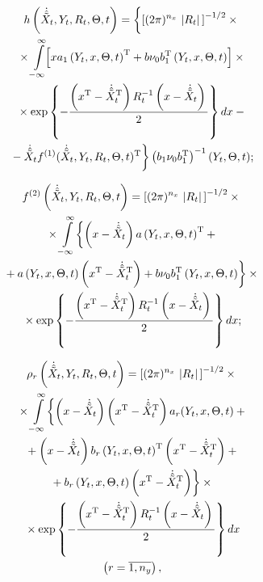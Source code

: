 \begin{multicols}{2}
    \noindent
\begin{multline*}
h\left(\dot{\hat{\tilde  X}}_t, Y_t,R_t,\Theta,t\right)=\biggl\{ \lk (2\pi)^{n_x}\lv
    R_t\rv\rk^{-1/2}\times{}\\
    {}\times\int\limits_{-\infty}^\infty\!\!
    \lk xa_1\left(Y_t,x,\Theta,t\right)^{\mathrm{T}} + b\nu_0 b_1^{\mathrm{T}} \left(Y_t,x,\Theta,t\right)\rk\times{}\\
{}\times \exp \lf -\fr{\left(x^{\mathrm{T}} -\dot{\hat{\tilde  X}}_t^{\mathrm{T}}\right) R_t^{-1} \left(x -
\dot{\hat{\tilde X}}_t\right)}{2}\rf dx-{}\\
{}-
    \dot{\hat{\tilde  X}}_t f^{(1)}(\dot{\hat{\tilde  X}}_t, 
Y_t,R_t,\Theta,t)^{\mathrm{T}}\biggr\} %
\left(b_1\nu_0 b_1^{\mathrm{T}}\right)^{-1} (Y_t,\Theta,t);
\end{multline*}

\vspace*{-14pt}

\noindent
\begin{multline*}
f^{(2)}\left(\dot{\hat{\tilde  X}}_t, Y_t,R_t,\Theta,t\right)=\left[ (2\pi)^{n_x}\,\left\vert
    R_t\right\vert\,\right]^{-1/2}\times{}\\
    {}\times 
    \int\limits_{-\infty}^\infty
    \biggl\{  \left(x-\dot{\hat{\tilde  X}}_t\right)a\left(Y_t,x,\Theta,t\right)^{\mathrm{T}} + {}\\
{}+ a \left(Y_t,x,\Theta,t\right) \left(x^{\mathrm{T}}-\dot{\hat{\tilde X}}_t^{\mathrm{T}}\right) +b\nu_0 b_1^{\mathrm{T}} 
\left(Y_t,x,\Theta,t\right)\biggr\}\times{}\\
{}\times \exp \left\{ -\displaystyle\frac{\displaystyle \left(x^{\mathrm{T}} -\dot{\hat{\tilde  X}}_t^{\mathrm{T}}\right) R_t^{-1}\left(x -
\dot{\hat{\tilde  X}}_t\right)\mathstrut}{\displaystyle 2\mathstrut}\right\}
    dx;
    \end{multline*}
    
    \vspace*{-14pt}
    
    \noindent
 \begin{multline}
 \rho_r\left(\dot{\hat{\tilde  X}}_t,Y_t, R_t,\Theta,t\right)=\left[ (2\pi)^{n_x}\,\left\vert
    R_t\right\vert\,\right]^{-1/2}\times{}\\
    {}\times \int\limits_{-\infty}^\infty
    \biggl\{  \left(x-\dot{\hat{\tilde  X}}_t\right)\left(x^{\mathrm{T}}-\dot{\hat{\tilde  X}}_t^{\mathrm{T}}\right) a_r 
(Y_t,x,\Theta,t)+ {}\\
{}+ \left(x-\dot{\hat{\tilde  X}}_t\right) b_r\left(Y_t,x,\Theta,t\right)^{\mathrm{T}} \left(x^{\mathrm{T}}-\dot{\hat{\tilde  
X}}_t^{\mathrm{T}}\right)+{}\\
{}+b_r \left(Y_t,x,\Theta,t\right) \left(x^{\mathrm{T}}-\dot{\hat{\tilde  X}}_t^{\mathrm{T}}\right)\biggr\} \times{}\\
{}\times \exp \left\{ -
\displaystyle\frac{\displaystyle \left(x^{\mathrm{T}} -\dot{\hat{\tilde  X}}_t^{\mathrm{T}}\right) R_t^{-1} \left(x -
\dot{\hat{\tilde  X}}_t\right)\mathstrut}{\displaystyle 2\mathstrut}\right\} dx\\
 \left(r=\overline{1,n_y}\right),\label{e3.13-s}
\end{multline}


\end{multicols}
